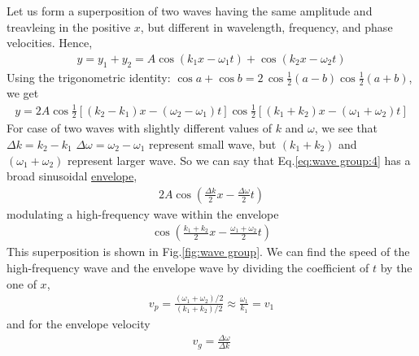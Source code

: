         \bulletpar Let us form a superposition of two waves having the same amplitude and treavleing in the positive $x$, but different in wavelength, frequency, 
        and phase velocities. Hence,
        \begin{align}
            \label{eq:wave group:3}
            y = y_1 + y_2 = A \cos{(k_1 x - \omega_1 t)} + \cos{(k_2 x - \omega_2 t)}
        \end{align}
        Using the trigonometric identity: $\cos{a} + \cos{b} = 2\, \cos{\frac{1}{2}(a-b)} \cos{\frac{1}{2}(a+b)}$, we get 
        \begin{align}
            \label{eq:wave group:4}
            y = 2A \cos{\frac{1}{2}\left[ (k_2-k_1)x - (\omega_2-\omega_1)t \right]} \cos{\frac{1}{2} \left[(k_1+k_2)x - (\omega_1+\omega_2)t \right]}
        \end{align}
        For case of two waves with slightly different values of $k$ and $\omega$, we see that $\Delta{k} = k_2-k_1$ $\Delta{\omega} = \omega_2-\omega_1$ represent 
        small wave, but $(k_1+k_2)$ and $(\omega_1 + \omega_2)$ represent larger wave. So we can say that Eq.\eqref{eq:wave group:4} has a broad sinusoidal 
        \underline{envelope}, 
        \begin{align}
            \label{eq:wave group:5}
            2A \cos{\left( \frac{\Delta{k}}{2}x - \frac{\Delta{\omega}}{2}t \right)}
        \end{align}
        modulating a high-frequency wave within the envelope
        \begin{align}
            \label{eq:wave group:6}
            \cos{\left( \frac{k_1+k_2}{2}x - \frac{\omega_1+\omega_2}{2}t \right)}
        \end{align}
        This superposition is shown in Fig.\eqref{fig:wave group}. We can find the speed of the high-frequency wave and the envelope wave by dividing the 
        coefficient of $t$ by the one of $x$,
        \begin{align}
            \label{eq:wave group:7}
            v_p = \frac{(\omega_1+\omega_2)/2}{(k_1+k_2)/2} \approx \frac{\omega_1}{k_1} = v_1
        \end{align}
        and for the envelope velocity
        \begin{align}
            \label{eq:wave group:7}
            v_g = \frac{\Delta{\omega}}{\Delta{k}}
        \end{align}

